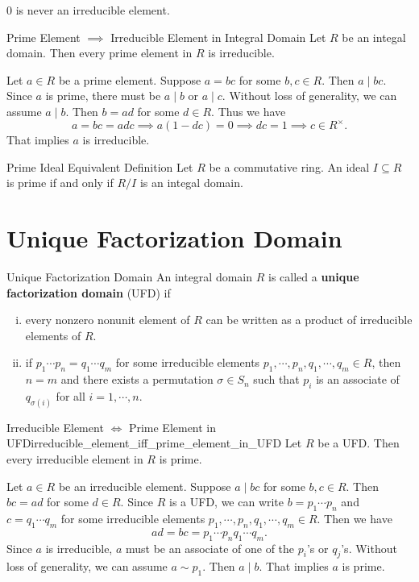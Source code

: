 0 is never an irreducible element.
\begin{proposition}{Prime Element $\implies$ Irreducible Element in Integral Domain}{}
    Let $R$ be an integal domain. Then every prime element in $R$ is irreducible.
\end{proposition}

\begin{prf}
    Let $a\in R$ be a prime element. Suppose $a=bc$ for some $b,c\in R$. Then $a\mid bc$. Since $a$ is prime, there must be $a\mid b$ or $a\mid c$. Without loss of generality, we can assume $a\mid b$. Then $b=ad$ for some $d\in R$. Thus we have $$a=bc=adc\implies a(1-dc)=0\implies dc=1\implies c\in R^\times.$$ That implies $a$ is irreducible.
\end{prf}

\begin{proposition}{Prime Ideal Equivalent Definition}{}
    Let $R$ be a commutative ring. An ideal $I\subseteq R$ is prime if and only if $R/I$ is an integal domain.
\end{proposition}


\section{Unique Factorization Domain}
\begin{definition}{Unique Factorization Domain}{}
    An integral domain $R$ is called a \textbf{unique factorization domain} (UFD) if
    \begin{enumerate}[(i)]
        \item every nonzero nonunit element of $R$ can be written as a product of irreducible elements of $R$.
        \item if $p_1\cdots p_n=q_1\cdots q_m$ for some irreducible elements $p_1,\cdots,p_n,q_1,\cdots,q_m\in R$, then $n=m$ and there exists a permutation $\sigma\in S_n$ such that $p_i$ is an associate of $q_{\sigma(i)}$ for all $i=1,\cdots,n$.
    \end{enumerate}
\end{definition}

\begin{proposition}{Irreducible Element $\iff$ Prime Element in UFD}{irreducible_element_iff_prime_element_in_UFD}
    Let $R$ be a UFD. Then every irreducible element in $R$ is prime.
\end{proposition}

\begin{prf}
    Let $a\in R$ be an irreducible element. Suppose $a\mid bc$ for some $b,c\in R$. Then $bc=ad$ for some $d\in R$. Since $R$ is a UFD, we can write $b=p_1\cdots p_n$ and $c=q_1\cdots q_m$ for some irreducible elements $p_1,\cdots,p_n,q_1,\cdots,q_m\in R$. Then we have $$ad=bc=p_1\cdots p_nq_1\cdots q_m.$$ Since $a$ is irreducible, $a$ must be an associate of one of the $p_i$'s or $q_j$'s. Without loss of generality, we can assume $a\sim p_1$. Then $a\mid b$. That implies $a$ is prime.
\end{prf}


